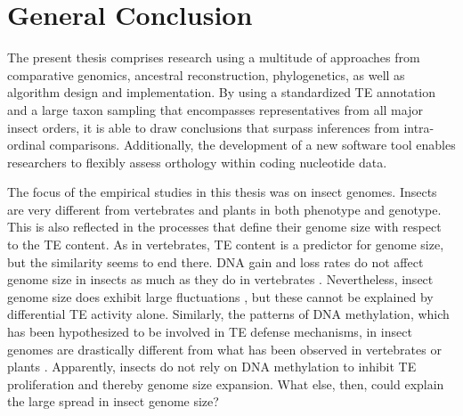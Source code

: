 \chapter{General Conclusion}
\label{conclusion}

The present thesis comprises research using a multitude of approaches
from comparative genomics, ancestral reconstruction, phylogenetics,
as well as algorithm design and implementation. By using a standardized TE
annotation and a large taxon sampling that encompasses representatives
from all major insect orders, it is able to draw conclusions that
surpass inferences from intra-ordinal comparisons.  Additionally, the
development of a new software tool enables researchers to flexibly
assess orthology within coding nucleotide data.

The focus of the empirical studies in this thesis was on insect genomes.
Insects are very different from vertebrates and plants in both phenotype
and genotype. This is also reflected in the processes that define their
genome size with respect to the TE content. As in vertebrates, TE
content is a predictor for genome size, but the similarity seems to end
there.  DNA gain and loss rates do not affect genome size in insects as
much as they do in vertebrates \citep{Kapusta2017-1,Lindblad-Toh2005}.
Nevertheless, insect genome size does exhibit large fluctuations
\citep{Alfsnes2017}, but these cannot be explained by differential TE
activity alone. Similarly, the patterns of DNA methylation, which has
been hypothesized to be involved in TE defense mechanisms, in insect
genomes are drastically different from what has been observed in
vertebrates or plants \citep{Provataris2018,Suzuki2008}.  Apparently,
insects do not rely on DNA methylation to inhibit TE proliferation and
thereby genome size expansion. What else, then, could explain the large
spread in insect genome size?

